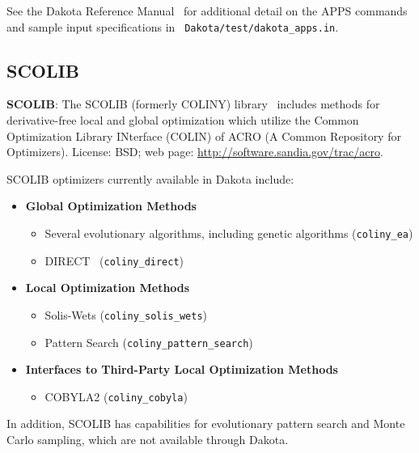 See the Dakota Reference Manual~\cite{RefMan} for additional detail on
the APPS commands and sample input specifications in {\tt
Dakota/test/dakota\_apps.in}.

\subsection{SCOLIB}\label{opt:software:coliny}

\textbf{SCOLIB}: The SCOLIB (formerly COLINY) library~\cite{Har06}
includes methods for derivative-free local and global optimization
which utilize the Common Optimization Library INterface (COLIN) of
ACRO (A Common Repository for Optimizers).  License: BSD; web page:
\url{http://software.sandia.gov/trac/acro}.

SCOLIB optimizers currently available in Dakota include:
\begin{itemize}

\item {\bf Global Optimization Methods}
  \begin{itemize}
  \item Several evolutionary algorithms, including genetic algorithms
    (\texttt{coliny\_ea})
  \item DIRECT~\cite{Per93} (\texttt{coliny\_direct})
  \end{itemize}

\item {\bf Local Optimization Methods}
  \begin{itemize}
  \item Solis-Wets (\texttt{coliny\_solis\_wets})
  \item Pattern Search (\texttt{coliny\_pattern\_search})
  \end{itemize}

\item {\bf Interfaces to Third-Party Local Optimization Methods}
  \begin{itemize}
  \item COBYLA2 (\texttt{coliny\_cobyla})
  \end{itemize}

\end{itemize}
In addition, SCOLIB has capabilities for evolutionary pattern search
and Monte Carlo sampling, which are not available through Dakota.

